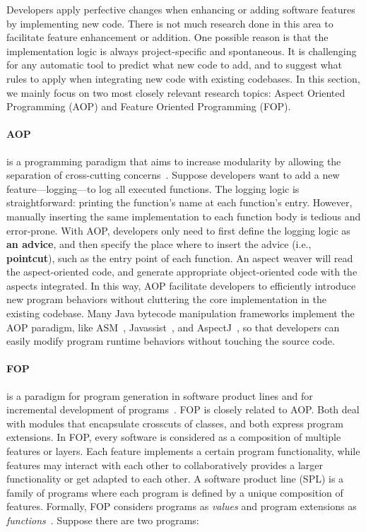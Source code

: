 \documentclass[runningheads,a4paper]{llncs}
\begin{document}
Developers apply perfective changes when enhancing or adding software features by implementing new code. There is not much research done in this area to facilitate feature enhancement or addition. One possible reason is that the implementation logic is always project-specific and spontaneous. It is challenging for any automatic tool to predict what new code to add, and to suggest what rules to apply when integrating new code with existing codebases. In this section, we mainly focus on two most closely relevant research topics: Aspect Oriented Programming (AOP) and Feature Oriented Programming (FOP).

\paragraph{AOP} is a programming paradigm that aims to increase modularity by allowing the separation of cross-cutting concerns~\cite{Kiczales1997}. Suppose developers want to add a new feature---logging---to log all executed functions. 
The logging logic is straightforward: printing the function's name at each function's entry. However, manually inserting the same implementation to each function body is tedious and error-prone. With AOP, developers only need to first define the logging logic as \textbf{an advice}, and then specify the place where to insert the advice (i.e., \textbf{pointcut}), such as the entry point of each function. An aspect weaver will read the aspect-oriented code, and generate appropriate object-oriented code with the aspects integrated. In this way, AOP facilitate developers to efficiently introduce new program behaviors without cluttering the core implementation in the existing codebase. Many Java bytecode manipulation frameworks implement the AOP paradigm, like ASM~\cite{asm}, Javassist~\cite{javassist}, and AspectJ~\cite{aspectj}, so that developers can easily modify program runtime behaviors without touching the source code. 


\paragraph{FOP} is a paradigm for program generation in software product lines and for incremental development of programs~\cite{Batory1992:DIH}. 
FOP is closely related to AOP. Both deal with modules that encapsulate crosscuts of classes, and both express program extensions.
In FOP, every software is considered as a composition of multiple features or layers. Each feature implements a certain program functionality, while features may interact with each other to collaboratively provides a larger functionality or get adapted to each other.
A software product line (SPL) is a family of programs where each program is defined by a unique composition of features. Formally, FOP considers programs as \emph{values} and program extensions as \emph{functions}~\cite{Lammel2013:fop}. Suppose there are two programs: 
\end{document}
